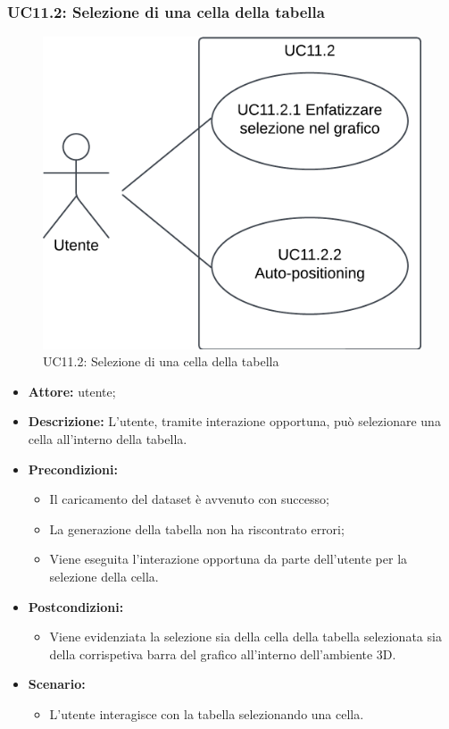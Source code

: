\subsubsection{UC11.2: Selezione di una cella della tabella}
\begin{figure}[h!]\centering
    \includegraphics[scale=0.7]{template/images/UC11.2.png}
    \caption{UC11.2: Selezione di una cella della tabella}
\end{figure}
\begin{itemize}    
    \item \textbf{Attore:} utente;
    \item \textbf{Descrizione:} L'utente, tramite interazione opportuna, può selezionare una cella all'interno della tabella.
    \item \textbf{Precondizioni:}    
        \begin{itemize}
            \item Il caricamento del dataset è avvenuto con successo;
            \item La generazione della tabella non ha riscontrato errori;
            \item Viene eseguita l'interazione opportuna da parte dell'utente per la selezione della cella.
        \end{itemize}    
    \item \textbf{Postcondizioni:}
        \begin{itemize}
            \item Viene evidenziata la selezione sia della cella della tabella selezionata sia della corrispetiva barra del grafico all'interno dell'ambiente 3D.
        \end{itemize}    
    \item \textbf{Scenario:} 
        \begin{itemize}
            \item L'utente interagisce con la tabella selezionando una cella.
        \end{itemize}
\end{itemize}
